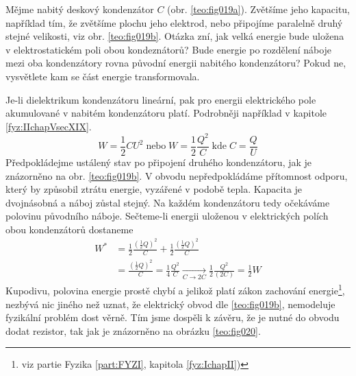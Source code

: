 \begin{mdframed}[style=mdexam]
  \begin{example}\label{teo:exam019}
    Mějme nabitý deskový kondenzátor \(C\) (obr. \ref{teo:fig019a}). Zvětšíme jeho kapacitu,
    například tím, že zvětšíme plochu jeho elektrod, nebo připojíme paralelně druhý stejné
    velikosti, viz obr. \ref{teo:fig019b}. Otázka zní, jak velká energie bude uložena v
    elektrostatickém poli obou kondeznátorů? Bude energie po rozdělení náboje mezi oba kondenzátory
    rovna původní energii nabitého kondenzátoru? Pokud ne, vysvětlete kam se část energie
    transformovala. 
    
    {\centering
      \captionsetup{type=figure}
      \hspace{1em}
      \hspace{1em}
      \label{teo:fig019}
    \par}
    
    Je-li dielektrikum kondenzátoru lineární, pak pro energii elektrického pole akumulované v
    nabitém kondenzátoru platí. Podrobněji například v kapitole \ref{fyz:IIchapVsecXIX}.
    \begin{equation}
      W = \frac{1}{2}CU^2 \;\text{nebo}\; W = \frac{1}{2}\frac{Q^2}{C} \;\text{kde}\; 
      C = \frac{Q}{U}
    \end{equation}
    Předpokládejme ustálený stav po připojení druhého kondenzátoru, jak je znázorněno na obr.
    \ref{teo:fig019b}. V obvodu nepředpokládáme přítomnost odporu, který by způsobil ztrátu energie,
    vyzářené v podobě tepla. Kapacita je dvojnásobná a náboj zůstal stejný. Na každém kondenzátoru
    tedy očekáváme polovinu původního náboje. Sečteme-li energii uloženou v elektrických polích obou
    kondenzátorů dostaneme
    \begin{align*}
      W^* &= \frac{1}{2}\frac{(\frac{1}{2}Q)^2}{C} + \frac{1}{2}\frac{(\frac{1}{2}Q)^2}{C}   \\
          &= \frac{(\frac{1}{2}Q)^2}{C} =\frac{1}{4}\frac{Q^2}{C}                 
           \xrightarrow[C\rightarrow2C]{}
            \frac{1}{2}\frac{Q^2}{(2C)} = \frac{1}{2}W 
    \end{align*}
    Kupodivu, polovina energie prostě chybí a jelikož platí zákon zachování energie\footnote{viz
    partie Fyzika \ref{part:FYZI}, kapitola \ref{fyz:IchapII})}, nezbývá nic jiného než uznat, že
    elektrický obvod dle \ref{teo:fig019b}, nemodeluje fyzikální problém dost věrně. Tím jsme
    dospěli k závěru, že je nutné do obvodu dodat rezistor, tak jak je znázorněno na obrázku
    \ref{teo:fig020}.
    

\end{example}
\end{mdframed}
